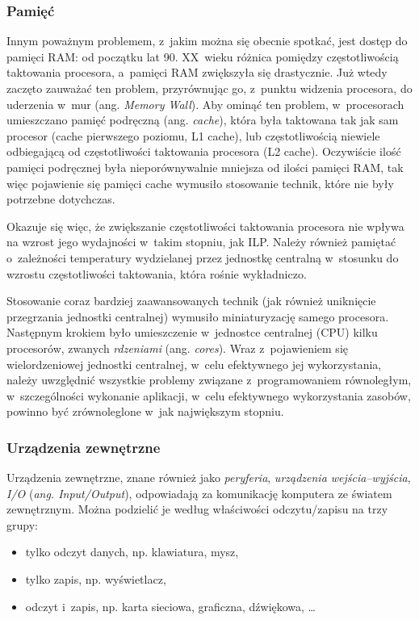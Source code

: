 \documentclass{mwart}
\begin{document}
\subsubsection{Pamięć}
\indent
	Innym poważnym problemem, z~jakim można się obecnie spotkać, jest dostęp do pamięci RAM: od początku lat 90. XX~wieku różnica
	pomiędzy częstotliwością taktowania procesora, a~pamięci RAM zwiększyła się drastycznie. Już wtedy zaczęto zauważać
	ten problem, przyrównując go, z~punktu widzenia procesora, do uderzenia w~mur (ang. \emph{Memory Wall}). Aby ominąć ten problem,
	w~procesorach umieszczano pamięć podręczną (ang. \emph{cache}), która była taktowana tak jak sam procesor (cache pierwszego poziomu, L1 cache),
	lub częstotliwością niewiele odbiegającą od częstotliwości taktowania procesora (L2 cache). Oczywiście ilość pamięci podręcznej
	była nieporównywalnie mniejsza od ilości pamięci RAM, tak więc pojawienie się pamięci cache wymusiło stosowanie technik, które nie
	były potrzebne dotychczas.
\par
%
\indent
	Okazuje się więc, że zwiększanie częstotliwości taktowania procesora nie wpływa na wzrost jego wydajności w~takim stopniu, jak ILP.
	Należy również pamiętać o~zależności temperatury wydzielanej przez jednostkę centralną w~stosunku do wzrostu częstotliwości taktowania,
	która rośnie wykładniczo.
\par
%
\indent
	Stosowanie coraz bardziej zaawansowanych technik (jak również uniknięcie przegrzania jednostki centralnej)
	wymusiło miniaturyzację samego procesora. Następnym krokiem było umieszczenie w~jednostce
	centralnej (CPU) kilku procesorów, zwanych \emph{rdzeniami} (ang. \emph{cores}). Wraz z~pojawieniem się wielordzeniowej jednostki centralnej,
	w~celu efektywnego jej wykorzystania, należy uwzględnić wszystkie problemy związane z~programowaniem równoległym, w~szczególności
	wykonanie aplikacji, w~celu efektywnego wykorzystania zasobów, powinno być zrównoleglone w~jak największym stopniu.
\par

\subsubsection{Urządzenia zewnętrzne}
\indent
	Urządzenia zewnętrzne, znane również jako \emph{peryferia}, \emph{urządzenia wejścia--wyjścia}, \emph{I/O} (\emph{ang. Input/Output}),
	odpowiadają za komunikację komputera ze światem zewnętrznym. Można podzielić je według właściwości odczytu/zapisu na trzy grupy:
	\begin{itemize}
		\item{tylko odczyt danych, np.} klawiatura, mysz, 
		\item{tylko zapis, np.} wyświetlacz,
		\item{odczyt i~zapis, np.} karta sieciowa, graficzna, dźwiękowa, \ldots
	\end{itemize}
\par
\end{document}
